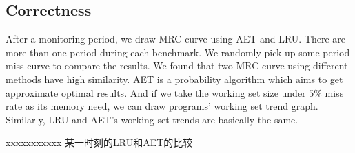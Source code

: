 \documentclass[10pt,twocolumn]{article}
\begin{document}
\subsection{Correctness}

After a monitoring period, we draw MRC curve using AET and LRU. There are more than one period during each benchmark. We randomly pick up some period miss curve to compare the results. We found that two MRC curve using different methods have high similarity. AET is a probability algorithm which aims to get approximate optimal results. And if we take the working set size under $5\%$ miss rate as its memory need, we can draw programs' working set trend graph. Similarly, LRU and AET's working set trends are basically the same.


xxxxxxxxxxx 某一时刻的LRU和AET的比较
\end{document}
